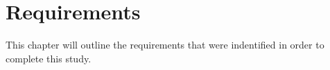 \chapter{Requirements}
	This chapter will outline the requirements that were indentified in order to complete this study.
	


